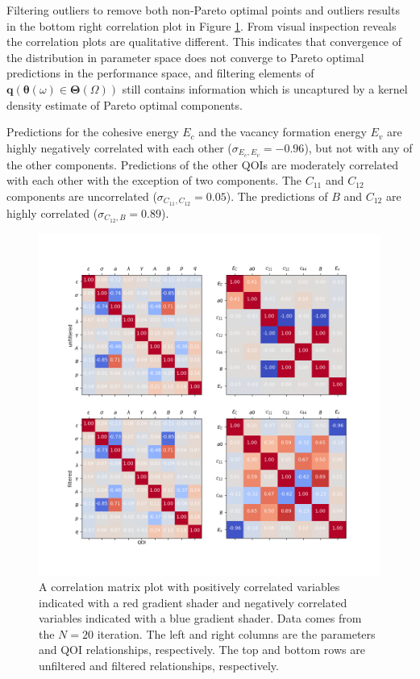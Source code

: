 Filtering outliers to remove both non-Pareto optimal points and outliers results in the bottom right correlation plot in Figure \ref{fig:Si_correlation_plots}.  From visual inspection reveals the correlation plots are qualitative different.  This indicates that convergence of the distribution in parameter space does not converge to Pareto optimal predictions in the performance space, and filtering elements of $\bm{q}(\bm{\theta}(\omega) \in \bm{\Theta}(\Omega))$ still contains information which is uncaptured by a kernel density estimate of Pareto optimal components.

Predictions for the cohesive energy $E_c$ and the vacancy formation energy $E_v$ are highly negatively correlated with each other ($\sigma_{E_c,E_v}=-0.96$), but not with any of the other components.  Predictions of the other QOIs are moderately correlated with each other with the exception of two components.  The $C_{11}$ and $C_{12}$ components are uncorrelated ($\sigma_{C_{11},C_{12}}=0.05$).  The predictions of $B$ and $C_{12}$ are highly correlated ($\sigma_{C_{12},B}=0.89$).

\begin{figure}[ht]
  \centering
  \includegraphics[width=5in]{chapter8/fig_cov_19}
  \caption{A correlation matrix plot with positively correlated variables indicated with a red gradient shader and negatively correlated variables indicated with a blue gradient shader.  Data comes from the $N=20$ iteration.  The left and right columns are the parameters and QOI relationships, respectively.  The top and bottom rows are unfiltered and filtered relationships, respectively.}
  \label{fig:Si_correlation_plots}
\end{figure}

